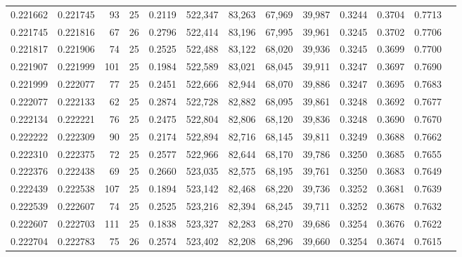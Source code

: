 \begin{tabular}{rrrrrrrrrrrrr}
0.221662 & 0.221745 &    93 &  25 &                                     0.2119 & 522,347 &  83,263 &  67,969 &  39,987 & 0.3244 & 0.3704 & 0.7713 \\
0.221745 & 0.221816 &    67 &  26 &                                     0.2796 & 522,414 &  83,196 &  67,995 &  39,961 & 0.3245 & 0.3702 & 0.7706 \\
0.221817 & 0.221906 &    74 &  25 &                                     0.2525 & 522,488 &  83,122 &  68,020 &  39,936 & 0.3245 & 0.3699 & 0.7700 \\
0.221907 & 0.221999 &   101 &  25 &                                     0.1984 & 522,589 &  83,021 &  68,045 &  39,911 & 0.3247 & 0.3697 & 0.7690 \\
0.221999 & 0.222077 &    77 &  25 &                                     0.2451 & 522,666 &  82,944 &  68,070 &  39,886 & 0.3247 & 0.3695 & 0.7683 \\
0.222077 & 0.222133 &    62 &  25 &                                     0.2874 & 522,728 &  82,882 &  68,095 &  39,861 & 0.3248 & 0.3692 & 0.7677 \\
0.222134 & 0.222221 &    76 &  25 &                                     0.2475 & 522,804 &  82,806 &  68,120 &  39,836 & 0.3248 & 0.3690 & 0.7670 \\
0.222222 & 0.222309 &    90 &  25 &                                     0.2174 & 522,894 &  82,716 &  68,145 &  39,811 & 0.3249 & 0.3688 & 0.7662 \\
0.222310 & 0.222375 &    72 &  25 &                                     0.2577 & 522,966 &  82,644 &  68,170 &  39,786 & 0.3250 & 0.3685 & 0.7655 \\
0.222376 & 0.222438 &    69 &  25 &                                     0.2660 & 523,035 &  82,575 &  68,195 &  39,761 & 0.3250 & 0.3683 & 0.7649 \\
0.222439 & 0.222538 &   107 &  25 &                                     0.1894 & 523,142 &  82,468 &  68,220 &  39,736 & 0.3252 & 0.3681 & 0.7639 \\
0.222539 & 0.222607 &    74 &  25 &                                     0.2525 & 523,216 &  82,394 &  68,245 &  39,711 & 0.3252 & 0.3678 & 0.7632 \\
0.222607 & 0.222703 &   111 &  25 &                                     0.1838 & 523,327 &  82,283 &  68,270 &  39,686 & 0.3254 & 0.3676 & 0.7622 \\
0.222704 & 0.222783 &    75 &  26 &                                     0.2574 & 523,402 &  82,208 &  68,296 &  39,660 & 0.3254 & 0.3674 & 0.7615 \\

\end{tabular}
